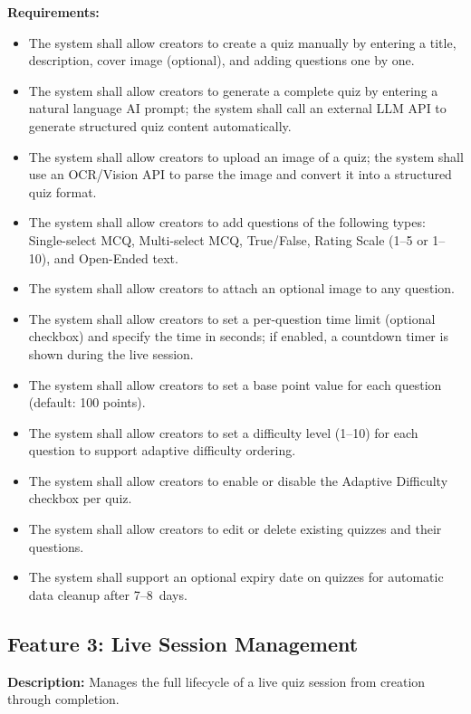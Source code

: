 \documentclass[12pt,a4paper]{article}
\begin{document}
\textbf{Requirements:}
\begin{itemize}
  \item[\textbf{FR7:}] The system shall allow creators to create a quiz manually by
        entering a title, description, cover image (optional), and adding questions
        one by one.
  \item[\textbf{FR8:}] The system shall allow creators to generate a complete quiz by
        entering a natural language AI prompt; the system shall call an external LLM
        API to generate structured quiz content automatically.
  \item[\textbf{FR9:}] The system shall allow creators to upload an image of a quiz;
        the system shall use an OCR/Vision API to parse the image and convert it into
        a structured quiz format.
  \item[\textbf{FR10:}] The system shall allow creators to add questions of the
        following types: Single-select MCQ, Multi-select MCQ, True/False, Rating
        Scale (1--5 or 1--10), and Open-Ended text.
  \item[\textbf{FR11:}] The system shall allow creators to attach an optional image
        to any question.
  \item[\textbf{FR12:}] The system shall allow creators to set a per-question time
        limit (optional checkbox) and specify the time in seconds; if enabled, a
        countdown timer is shown during the live session.
  \item[\textbf{FR13:}] The system shall allow creators to set a base point value for
        each question (default: 100 points).
  \item[\textbf{FR14:}] The system shall allow creators to set a difficulty level
        (1--10) for each question to support adaptive difficulty ordering.
  \item[\textbf{FR15:}] The system shall allow creators to enable or disable the
        Adaptive Difficulty checkbox per quiz.
  \item[\textbf{FR16:}] The system shall allow creators to edit or delete existing
        quizzes and their questions.
  \item[\textbf{FR17:}] The system shall support an optional expiry date on quizzes
        for automatic data cleanup after 7--8~days.
\end{itemize}

\subsection{Feature 3: Live Session Management}
\textbf{Description:} Manages the full lifecycle of a live quiz session from creation
through completion.
\end{document}

